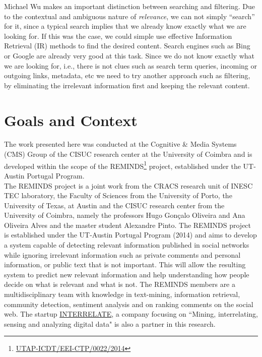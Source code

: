 Michael Wu \citep{SearchingFiltering} makes an important distinction between searching and filtering. Due to the contextual and ambiguous nature of \textit{relevance}, we can not simply ``search'' for it, since a typical search implies that we already know exactly what we are looking for. If this was the case, we could simple use effective Information Retrieval (IR) methods to find the desired content. Search engines such as Bing or Google are already very good at this task. Since we do not know exactly what we are looking for, i.e., there is not clues such as search term queries, incoming or outgoing links, metadata, etc  we need to try another approach such as filtering, by eliminating the irrelevant information first and keeping the relevant content.




\section{Goals and Context}
The work presented here was conducted at the Cognitive \& Media Systems (CMS) Group of the CISUC research center at the University of Coimbra and is developed within the scope of the REMINDS\footnote{\href{https://www.fct.pt/apoios/projectos/consulta/vglobal\_projecto.phtml.en?idProjecto=137420\&idElemConcurso=8525}{UTAP-ICDT/EEI-CTP/0022/2014}} project, established under the UT-Austin Portugal Program.\\
The REMINDS project is a joint work from the CRACS research unit of INESC TEC laboratory, the Faculty of Sciences from the University of Porto, the University of Texas, at Austin and the CISUC research center from the University of Coimbra, namely the professors Hugo Gonçalo Oliveira and Ana Oliveira Alves and the master student Alexandre Pinto. The REMINDS project is established under the UT-Austin Portugal Program (2014) and aims to develop a system capable of detecting relevant information published in social networks while ignoring irrelevant information such as private comments and personal information, or public text that is not important. This will allow the resulting system to predict new relevant information and help understanding how people decide on what is relevant and what is not. The REMINDS members are a multidisciplinary team with knowledge in text-mining, information retrieval, community detection, sentiment analysis and on ranking comments on the social web. The startup  \href{http://www.interrelate.pt}{INTERRELATE}, a company focusing on ``Mining, interrelating, sensing and analyzing digital data" is also a partner in this research.

